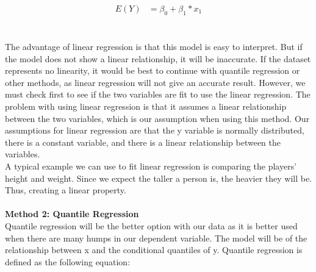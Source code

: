 \documentclass[11pt,letterpaper]{amsart}
\begin{document}
\begin{align*}
E(Y)&=\beta_0+\beta_1*x_1
\end{align*}
\\
\cite{5}\\
\indent The advantage of linear regression is that this model is easy to interpret. But if the model does not show a linear relationship, it will be inaccurate. If the dataset represents no linearity, it would be best to continue with quantile regression or other methods, as linear regression will not give an accurate result. However, we must check first to see if the two variables are fit to use the linear regression. The problem with using linear regression is that it assumes a linear relationship between the two variables, which is our assumption when using this method. Our assumptions for linear regression are that the y variable is normally distributed, there is a constant variable, and there is a linear relationship between the variables.\\
\indent A typical example we can use to fit linear regression is comparing the players’ height and weight. Since we expect the taller a person is, the heavier they will be. Thus, creating a linear property.
\\\\
\noindent \large \textbf{Method 2: Quantile Regression}\\
\indent Quantile regression will be the better option with our data as it is better used when there are many humps in our dependent variable. The model will be of the relationship between x and the conditional quantiles of y. Quantile regression is defined as the following equation:
\end{document}
